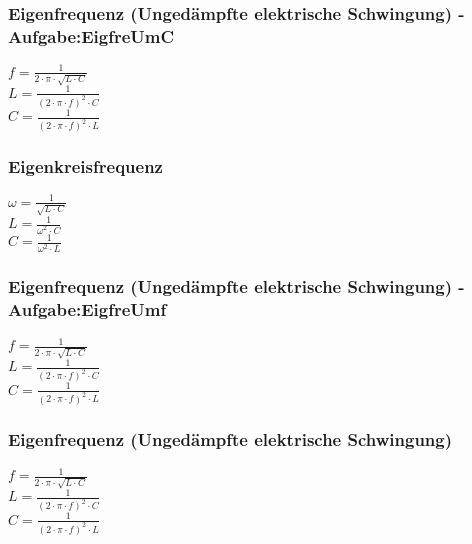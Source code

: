 \subsubsection{Eigenfrequenz (Ungedämpfte elektrische Schwingung) - Aufgabe:EigfreUmC} 
\begin{minipage}{0.45\textwidth} 
$ f = \frac{ 1}{2\cdot \pi \cdot \sqrt{L\cdot C}} $\\ 
$ L = \frac{ 1}{(2\cdot \pi \cdot f)^{2} \cdot C} $\\ 
$ C = \frac{ 1}{(2\cdot \pi \cdot f)^{2} \cdot L} $\\ 
\end{minipage} 
\begin{minipage}{0.45\textwidth} 
 
\end{minipage} 
\subsubsection{Eigenkreisfrequenz} 
\begin{minipage}{0.45\textwidth} 
$ \omega  = \frac{ 1}{\sqrt{L\cdot C}} $\\ 
$ L= \frac{ 1}{\omega ^{2} \cdot C} $\\ 
$ C = \frac{ 1}{\omega ^{2} \cdot L} $\\ 
\end{minipage} 
\begin{minipage}{0.45\textwidth} 
 
\end{minipage} 
\subsubsection{Eigenfrequenz (Ungedämpfte elektrische Schwingung) - Aufgabe:EigfreUmf} 
\begin{minipage}{0.45\textwidth} 
$ f = \frac{ 1}{2\cdot \pi \cdot \sqrt{L\cdot C}} $\\ 
$ L = \frac{ 1}{(2\cdot \pi \cdot f)^{2} \cdot C} $\\ 
$ C = \frac{ 1}{(2\cdot \pi \cdot f)^{2} \cdot L} $\\ 
\end{minipage} 
\begin{minipage}{0.45\textwidth} 
 
\end{minipage} 
\subsubsection{Eigenfrequenz (Ungedämpfte elektrische Schwingung)} 
\begin{minipage}{0.45\textwidth} 
$ f = \frac{ 1}{2\cdot \pi \cdot \sqrt{L\cdot C}} $\\ 
$ L = \frac{ 1}{(2\cdot \pi \cdot f)^{2} \cdot C} $\\ 
$ C = \frac{ 1}{(2\cdot \pi \cdot f)^{2} \cdot L} $\\ 
\end{minipage} 
\begin{minipage}{0.45\textwidth} 
 
\end{minipage} 

